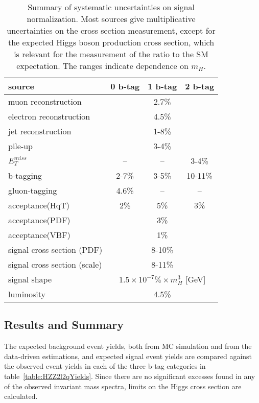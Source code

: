 \begin{table}
\begin{center}
\begin{tabular}{l|c|c|c}
\hline 
\hline

source & 0 b-tag & 1 b-tag & 2 b-tag \\ \hline \hline

muon reconstruction & \multicolumn{3}{c}{2.7\%} \\ \hline
electron reconstruction & \multicolumn{3}{c}{4.5\%} \\ \hline
jet reconstruction & \multicolumn{3}{c}{1-8\%} \\ \hline
pile-up & \multicolumn{3}{c}{3-4\%} \\ \hline
$E_T^{miss}$ & -- & -- & 3-4\% \\ \hline
b-tagging & 2-7\% & 3-5\% & 10-11\% \\ \hline
gluon-tagging & 4.6\% & -- & -- \\ \hline
acceptance(HqT) & 2\% & 5\% & 3\% \\ \hline
acceptance(PDF) & \multicolumn{3}{c}{3\%} \\ \hline
acceptance(VBF) & \multicolumn{3}{c}{1\%} \\ \hline
signal cross section (PDF) & \multicolumn{3}{c}{8-10\%} \\ \hline
signal cross section (scale) & \multicolumn{3}{c}{8-11\%} \\ \hline
signal shape    & \multicolumn{3}{c}{$1.5\times10^{-7}\%\times m_{H}^{3}$ [GeV]} \\ \hline
luminosity      & \multicolumn{3}{c}{4.5\%} \\ \hline \hline

\end{tabular}
\caption{Summary of systematic uncertainties on signal normalization.
Most sources give multiplicative uncertainties on the cross section
measurement, except for the expected Higgs boson production cross 
section, which is relevant for the measurement of the ratio to the 
SM expectation.  The ranges indicate dependence on $m_{H}$.}
\label{table:HZZ2l2qSystematics}
\end{center}
\end{table}

\subsection{Results and Summary}
\label{sec:HZZ2l2qxsec}

The expected background event yields, both from MC simulation and
from the data-driven estimations, and expected signal event yields
are compared against the observed event yields in each of the
three b-tag categories in table~\ref{table:HZZ2l2qYields}.
Since there are no significant excesses found in any of the
observed invariant mass spectra, limits on the Higgs cross section
are calculated.

